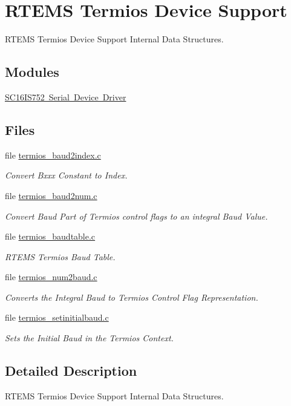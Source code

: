 \hypertarget{group__TermiostypesSupport}{}\section{R\+T\+E\+MS Termios Device Support}
\label{group__TermiostypesSupport}


R\+T\+E\+MS Termios Device Support Internal Data Structures.  


\subsection*{Modules}
\begin{DoxyCompactItemize}
\item 
\mbox{\hyperlink{group__SC16IS752}{S\+C16\+I\+S752 Serial Device Driver}}
\end{DoxyCompactItemize}
\subsection*{Files}
\begin{DoxyCompactItemize}
\item 
file \mbox{\hyperlink{termios__baud2index_8c}{termios\+\_\+baud2index.\+c}}
\begin{DoxyCompactList}\small\item\em Convert Bxxx Constant to Index. \end{DoxyCompactList}\item 
file \mbox{\hyperlink{termios__baud2num_8c}{termios\+\_\+baud2num.\+c}}
\begin{DoxyCompactList}\small\item\em Convert Baud Part of Termios control flags to an integral Baud Value. \end{DoxyCompactList}\item 
file \mbox{\hyperlink{termios__baudtable_8c}{termios\+\_\+baudtable.\+c}}
\begin{DoxyCompactList}\small\item\em R\+T\+E\+MS Termios Baud Table. \end{DoxyCompactList}\item 
file \mbox{\hyperlink{termios__num2baud_8c}{termios\+\_\+num2baud.\+c}}
\begin{DoxyCompactList}\small\item\em Converts the Integral Baud to Termios Control Flag Representation. \end{DoxyCompactList}\item 
file \mbox{\hyperlink{termios__setinitialbaud_8c}{termios\+\_\+setinitialbaud.\+c}}
\begin{DoxyCompactList}\small\item\em Sets the Initial Baud in the Termios Context. \end{DoxyCompactList}\end{DoxyCompactItemize}


\subsection{Detailed Description}
R\+T\+E\+MS Termios Device Support Internal Data Structures. 

